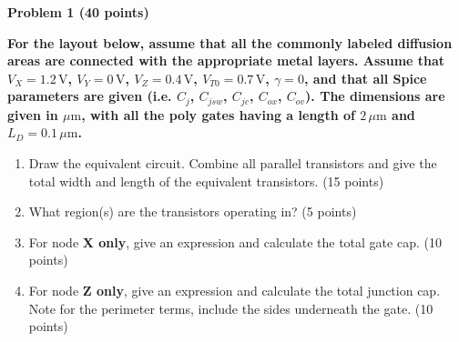 \begingroup
\fontsize{10.8}{12.2}\selectfont
\setlength{\parskip}{4pt}
\textbf{Problem 1 (40 points)}\par
\textbf{For the layout below, assume that all the commonly labeled diffusion areas are connected with the appropriate metal layers. Assume that $V_X=1.2\,\mathrm V$, $V_Y=0\,\mathrm V$, $V_Z=0.4\,\mathrm V$, $V_{T0}=0.7\,\mathrm V$, $\gamma=0$, and that all Spice parameters are given (i.e. $C_j$, $C_{jsw}$, $C_{jc}$, $C_{ox}$, $C_{ov}$). The dimensions are given in $\mu\mathrm m$, with all the poly gates having a length of $2\,\mu\mathrm m$ and $L_D=0.1\,\mu\mathrm m$.}
\begin{enumerate}[label=\alph*),leftmargin=19pt,itemsep=1pt,topsep=2pt]
\item Draw the equivalent circuit. Combine all parallel transistors and give the total width and length of the equivalent transistors. \hfill (15 points)
\item What region(s) are the transistors operating in? \hfill (5 points)
\item For node \textbf{X only}, give an expression and calculate the total gate cap. \hfill (10 points)
\item For node \textbf{Z only}, give an expression and calculate the total junction cap. Note for the perimeter terms, include the sides underneath the gate. \hfill (10 points)
\end{enumerate}

